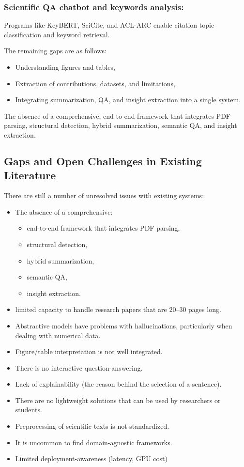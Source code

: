 \documentclass[conference]{IEEEtran}
\begin{document}
\subsubsection{Scientific QA chatbot and keywords analysis:}
Programs like KeyBERT, SciCite, and ACL-ARC enable citation topic classification and keyword retrieval.

The remaining gaps are as follows:
\begin{itemize}
    \item Understanding figures and tables,
    \item Extraction of contributions, datasets, and limitations, 
    \item Integrating summarization, QA, and insight extraction into a single system.
\end{itemize}

 The absence of a comprehensive, end-to-end framework that integrates PDF parsing, structural detection, hybrid summarization, semantic QA, and insight extraction.

\subsection{Gaps and Open Challenges in Existing Literature}
There are still a number of unresolved issues with existing systems:
\begin{itemize}
    \item The absence of a comprehensive:
    \begin{itemize}
        \item end-to-end framework that integrates PDF parsing,
        \item structural detection,
        \item hybrid summarization,
        \item semantic QA,
        \item insight extraction.
    \end{itemize}
    \item limited capacity to handle research papers that are 20–30 pages long.
    \item Abstractive models have problems with hallucinations, particularly when dealing with numerical data.
    \item Figure/table interpretation is not well integrated.
    \item There is no interactive question-answering.
    \item Lack of explainability (the reason behind the selection of a sentence).
    \item There are no lightweight solutions that can be used by researchers or students.
    \item Preprocessing of scientific texts is not standardized.
    \item It is uncommon to find domain-agnostic frameworks.
    \item Limited deployment-awareness (latency, GPU cost)
\end{itemize}
\end{document}

